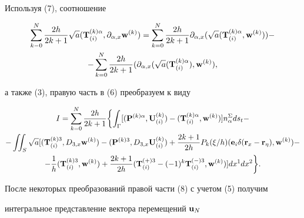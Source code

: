 Используя (7), соотношение 


\begin{multline*} 


\sum^N_{k-0}\frac{2h}{2k+1}\sqrt a 


({\bold T}^{(k)\alpha}_{(i)},\partial_{\alpha,x}{\bold w}^{(k)}) 


=\sum^N_{k=0}\frac{2h}{2k+1}\partial_{\alpha,x}(\sqrt a


({\bold T}^{(k)\alpha}_{(i)},{\bold w}^{(k)}))-\\ 


%


-\sum^N_{k=0}\frac{2h}{2k+1}(\partial_{\alpha,x}(\sqrt a


({\bold T}^{(k)\alpha}_{(i)}),{\bold w}^{(k)}),


\end{multline*} 


а также (3), правую часть в (6) преобразуем к виду 


\begin{multline} 


I=\sum^N_{k=0}\frac{2h}{2k+1}\biggl\{\int_\Gamma[ 


({\bold P}^{(k)\alpha},{\bold U}^{(k)}_{(i)})- 


({\bold T}^{(k)\alpha}_{(i)},{\bold w}^{(k)})]n^\Sigma_\alpha ds_t- \\


%


-\iint_S\sqrt a[({\bold T}^{(k)3}_{(i)},D_{3,x}{\bold w}^{(k)})- 


({\bold P}^{(k)3},D_{3,x}{\bold U}^{(k)}_{(i)})+


\frac{2k+1}{2h}P_k(\xi/h)({\bold e}_i \delta({\bold r}_x-{\bold r}_\eta), 


{\bold w}^{(k)})-\\


%


-\frac{1}{h}({\bold T}^{(k)3}_{(i)},{\bold w}^{(k)})+


\frac{2k+1}{2h}({\bold T}^{(+)3}_{(i)}-(-1)^k 


{\bold T}^{(-)3}_{(i)},{\bold w}^{(k)})]dx^1 dx^2\biggr\}. 


\end{multline} 


После некоторых преобразований правой части (8) с учетом (5) получим 


интегральное представление вектора перемещений ${\bold u}_N$



